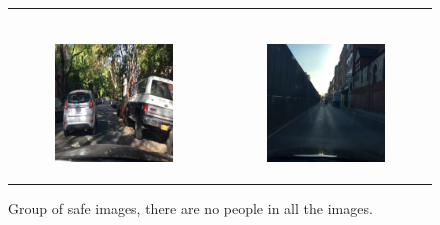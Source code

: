 \begin{figure}
\begin{tabular}{p{\horspace} p{\horspace}}
\begin{subfigure}[b]{\subfigwidth}
    \end{subfigure} \\
    \begin{subfigure}[b]{\subfigwidth}
        \includegraphics[width=\subfigwidth]{images/gpt4/s3.jpg}
    \end{subfigure}
    \hfill &
    \begin{subfigure}[b]{\subfigwidth}
        \includegraphics[width=\subfigwidth]{images/gpt4/s5.jpg}
    \end{subfigure}
\end{tabular}
\caption[Group of safe images for image classification.]
{Group of safe images, there are no people in all the images.}
\label{fig:sub_dangerous_group}
\end{figure}
